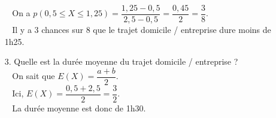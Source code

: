 \begin{itemize}
$\; \; $ On a $p\left(0,5 \leqslant X \leqslant 1,25\right) = \dfrac{1,25-0,5}{2,5-0,5} = \dfrac{0,45}{2} = \dfrac{3}{8}$. \\

$\; \; $ Il y a 3 chances sur 8 que le trajet domicile / entreprise dure moins de 1h25. \\

\item[3.] Quelle est la durée moyenne du trajet domicile / entreprise ? \\

$\; \;$ On sait que $E\left(X\right) = \dfrac{a+b}{2}$. \\

$\; \; $ Ici, $E\left(X\right) = \dfrac{0,5 + 2,5}{2} = \dfrac{3}{2}$. \\

$\; \; $ La durée moyenne est donc de 1h30.

\vspace*{-5cm}

\end{itemize}

\vspace*{-5cm}


\ifdefined\COMPLETE
\else
    
\fi